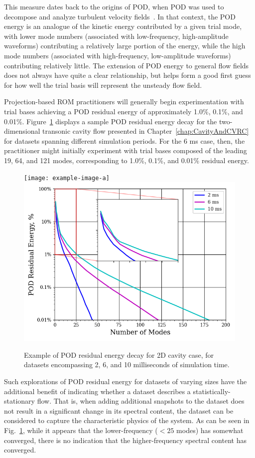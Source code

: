 This measure dates back to the origins of POD, when POD was used to decompose and analyze turbulent velocity fields~\cite{berkoozPOD}. In that context, the POD energy is an analogue of the kinetic energy contributed by a given trial mode, with lower mode numbers (associated with low-frequency, high-amplitude waveforms) contributing a relatively large portion of the energy, while the high mode numbers (associated with high-frequency, low-amplitude waveforms) contributing relatively little. The extension of POD energy to general flow fields does not always have quite a clear relationship, but helps form a good first guess for how well the trial basis will represent the unsteady flow field.

Projection-based ROM practitioners will generally begin experimentation with trial bases achieving a POD residual energy of approximately 1.0\%, 0.1\%, and 0.01\%. Figure~\ref{fig:samplePODEnergy} displays a sample POD residual energy decay for the two-dimensional transonic cavity flow presented in Chapter~\ref{chap:CavityAndCVRC} for datasets spanning different simulation periods. For the 6 ms case, then, the practitioner might initially experiment with trial bases composed of the leading 19, 64, and 121 modes, corresponding to 1.0\%, 0.1\%, and 0.01\% residual energy.

\begin{figure}
	\centering
    \ifdefined\DRAFT
		\texttt{[image: example-image-a]}
	\else
	    \includegraphics[width=0.6\linewidth]{Chapters/ProjROMs/Images/pod_energy_2dCavity_example.png}
    \fi
	\caption{\label{fig:samplePODEnergy}Example of POD residual energy decay for 2D cavity case, for datasets encompassing 2, 6, and 10 milliseconds of simulation time.}
\end{figure}

Such explorations of POD residual energy for datasets of varying sizes have the additional benefit of indicating whether a dataset describes a statistically-stationary flow. That is, when adding additional snapshots to the dataset does not result in a significant change in its spectral content, the dataset can be considered to capture the characteristic physics of the system. As can be seen in Fig.~\ref{fig:samplePODEnergy}, while it appears that the lower-frequency ($< 25$ modes) has somewhat converged, there is no indication that the higher-frequency spectral content has converged.


